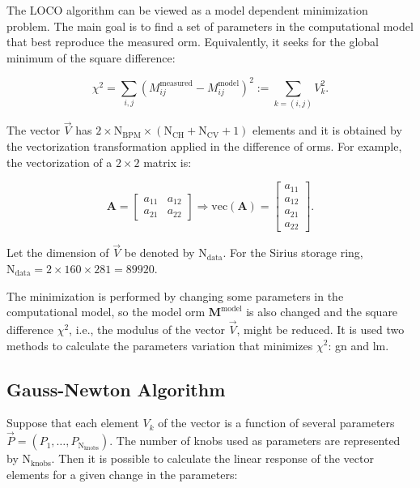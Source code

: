 The LOCO algorithm can be viewed as a model dependent minimization problem. The main goal is to find a set of parameters in the computational model that best reproduce the measured \gls{orm}. Equivalently, it seeks for the global minimum of the square difference:

\begin{equation}
    \chi^2 = \sum_{i, j} \left(M^{\mathrm{measured}}_{ij} - M^{\mathrm{model}}_{ij}\right)^2 := \sum_{{k = (i,j)}} V_{k}^2.
    \label{eq:chi2}
\end{equation}

The vector $\vec{V}$ has $2 \times \mathrm{N}_{\mathrm{BPM}} \times \left(\mathrm{N}_{\mathrm{CH}} + \mathrm{N}_{\mathrm{CV}}+1\right)$ elements and it is obtained by the vectorization transformation applied in the difference of \gls{orm}s. For example, the vectorization of a $2 \times 2$ matrix is:

\begin{equation}
        \mathbf{A} = \begin{bmatrix}
     a_{11} & a_{12} \\
     a_{21} & a_{22} 
\end{bmatrix} \Rightarrow \mathrm{vec}\left(\mathbf{A}\right) = \begin{bmatrix}
     a_{11}  \\
     a_{12} \\
     a_{21} \\ 
     a_{22} 
\end{bmatrix}.
\end{equation}

Let the dimension of $\vec{V}$ be denoted by $\mathrm{N}_{\mathrm{data}}$. For the Sirius storage ring, $\mathrm{N}_{\mathrm{data}} = 2 \times 160 \times 281 = 89920$.

The minimization is performed by changing some parameters in the computational model, so the model \gls{orm} $\mathbf{M}^{\mathrm{model}}$ is also changed and the square difference $\chi^2$, i.e., the modulus of the vector $\vec{V}$, might be reduced. It is used two methods to calculate the parameters variation that minimizes $\chi^2$: \gls{gn} and \gls{lm}.

\subsection{Gauss-Newton Algorithm}

Suppose that each element $V_k$ of the vector is a function of several parameters $\vec{P} = \left(P_1, \ldots, P_{\mathrm{N}_{\mathrm{knobs}}}\right)$. The number of knobs used as parameters are represented by $\mathrm{N}_{\mathrm{knobs}}$. Then it is possible to calculate the linear response of the vector elements for a given change in the parameters:

